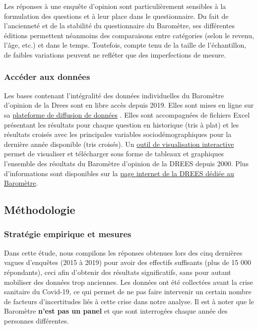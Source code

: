 \documentclass[12pt,a4paper]{reedthesis}
\begin{document}
Les réponses à une enquête d'opinion sont particulièrement sensibles à la formulation des questions et à leur place dans le questionnaire. Du fait de l'ancienneté et de la stabilité du questionnaire du Baromètre, ses différentes éditions permettent néanmoins des comparaisons entre catégories (selon le revenu, l'âge, etc.) et dans le temps. Toutefois, compte tenu de la taille de l'échantillon, de faibles variations peuvent ne refléter que des imperfections de mesure.

\hypertarget{accuxe9der-aux-donnuxe9es}{%
\subsubsection{Accéder aux données}\label{accuxe9der-aux-donnuxe9es}}

Les bases contenant l'intégralité des données individuelles du Baromètre d'opinion de la Drees sont en libre accès depuis 2019. Elles sont mises en ligne sur sa \href{http://www.data.drees.sante.gouv.fr/}{plateforme de diffusion de données} . Elles sont accompagnées de fichiers Excel présentant les résultats pour chaque question en historique (tris à plat) et les résultats croisés avec les principales variables sociodémographiques pour la dernière année disponible (tris croisés). Un \href{http://dataviz.drees.solidarites-sante.gouv.fr/Barometre-DREES}{outil de visualisation interactive} permet de visualiser et télécharger sous forme de tableaux et graphiques l'ensemble des résultats du Baromètre d'opinion de la DREES depuis 2000. Plus d'informations sont disponibles sur la \href{https://drees.solidarites-sante.gouv.fr/etudes-et-statistiques/open-data/aide-et-action-sociale/article/le-barometre-d-opinion-de-la-drees}{page internet de la DREES dédiée au Baromètre}.

\hypertarget{sec:methodo}{%
\subsection{Méthodologie}\label{sec:methodo}}

\hypertarget{sec:mesures}{%
\subsubsection{Stratégie empirique et mesures}\label{sec:mesures}}

Dans cette étude, nous compilons les réponses obtenues lors des cinq dernières vagues d'enquêtes (2015 à 2019) pour avoir des effectifs suffisants (plus de 15 000 répondants), ceci afin d'obtenir des résultats significatifs, sans pour autant mobiliser des données trop anciennes. Les données ont été collectées avant la crise sanitaire du Covid-19, ce qui permet de ne pas faire intervenir un certain nombre de facteurs d'incertitudes liés à cette crise dans notre analyse. Il est à noter que le Baromètre \textbf{n'est pas un panel} et que sont interrogées chaque année des personnes différentes.
\end{document}
